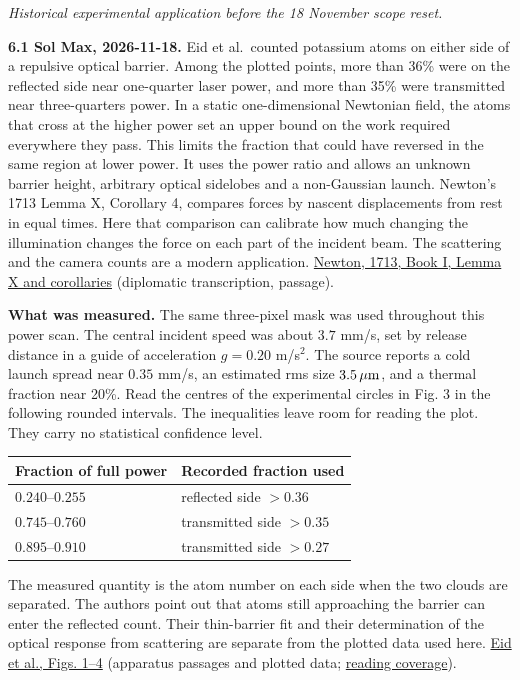 \documentclass[11pt,a4paper]{article}
\begin{document}
\emph{Historical experimental application before the 18 November scope
reset.}

\textbf{6.1 Sol Max, 2026-11-18.} Eid et al.~counted potassium atoms on
either side of a repulsive optical barrier. Among the plotted points,
more than 36\% were on the reflected side near one-quarter laser power,
and more than 35\% were transmitted near three-quarters power. In a
static one-dimensional Newtonian field, the atoms that cross at the
higher power set an upper bound on the work required everywhere they
pass. This limits the fraction that could have reversed in the same
region at lower power. It uses the power ratio and allows an unknown
barrier height, arbitrary optical sidelobes and a non-Gaussian launch.
Newton's 1713 Lemma X, Corollary 4, compares forces by nascent
displacements from rest in equal times. Here that comparison can
calibrate how much changing the illumination changes the force on each
part of the incident beam. The scattering and the camera counts are a
modern application.
\href{https://www.newtonproject.ox.ac.uk/view/texts/diplomatic/NATP00082\#par26}{Newton,
1713, Book I, Lemma X and corollaries} (diplomatic transcription,
passage).

\textbf{What was measured.} The same three-pixel mask was used
throughout this power scan. The central incident speed was about \(3.7\)
mm/s, set by release distance in a guide of acceleration \(g=0.20\)
m/s\(^2\). The source reports a cold launch spread near \(0.35\) mm/s,
an estimated rms size \(3.5\,\mu{\rm m}\), and a thermal fraction near
20\%. Read the centres of the experimental circles in Fig. 3 in the
following rounded intervals. The inequalities leave room for reading the
plot. They carry no statistical confidence level.

\begin{longtable}[]{@{}ll@{}}
\toprule\noalign{}
Fraction of full power & Recorded fraction used \\
\midrule\noalign{}
\endhead
\bottomrule\noalign{}
\endlastfoot
\(0.240\)--\(0.255\) & reflected side \(>0.36\) \\
\(0.745\)--\(0.760\) & transmitted side \(>0.35\) \\
\(0.895\)--\(0.910\) & transmitted side \(>0.27\) \\
\end{longtable}

The measured quantity is the atom number on each side when the two
clouds are separated. The authors point out that atoms still approaching
the barrier can enter the reflected count. Their thin-barrier fit and
their determination of the optical response from scattering are separate
from the plotted data used here.
\href{https://arxiv.org/html/2405.14466v1\#S0.F3}{Eid et al., Figs.
1--4} (apparatus passages and plotted data;
\href{../docs/EidEtAl_OpticalBarriers_2024.md}{reading coverage}).
\end{document}
